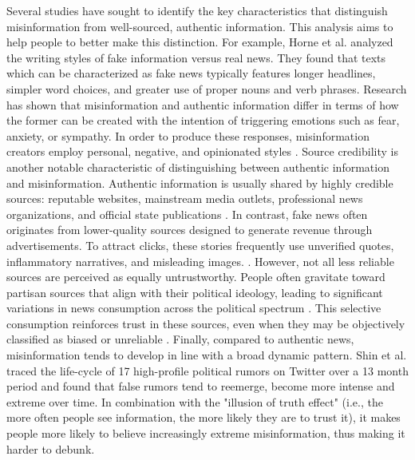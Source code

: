 Several studies have sought to identify the key characteristics that distinguish misinformation from well-sourced, authentic information. This analysis aims to help%
people to better make this distinction. For example, Horne et al. analyzed the writing styles of fake information versus real news. They found that texts which can be characterized as fake news typically features longer headlines, simpler word choices, and greater use of proper nouns and verb phrases\cite{horne2017just}.
Research has shown that misinformation and authentic information differ in terms of how the former can be created with the intention of triggering emotions such as fear, anxiety, or sympathy\cite{choudhary2021linguistic, zhang2020overview}. In order to produce these responses, misinformation creators %
employ personal, negative, and opinionated styles \cite{bessi2015trend,porat2019content}.
Source credibility is another notable characteristic of distinguishing between authentic information and misinformation. Authentic information is usually shared by highly credible sources: reputable websites, mainstream media outlets, professional news organizations, and official state publications \cite{molina2021fake,zhang2020overview,shin2018diffusion}.  In contrast, fake news often originates from lower-quality sources designed to generate revenue through advertisements.  To attract clicks, these stories frequently use unverified quotes, inflammatory narratives, and misleading images. %
\cite{molina2021fake,shu2017fake}. However, not all less reliable sources are perceived as equally untrustworthy. People often gravitate toward partisan sources that align with their political ideology, leading to significant variations in news consumption across the political spectrum \cite{faris2017partisanship}. This selective consumption reinforces trust in these sources, even when they may be objectively classified as biased or unreliable \cite{mummolo2016news, pennycook2019fighting}.
Finally, compared to authentic news, misinformation tends to develop in line with a broad dynamic pattern. Shin et al. traced the life-cycle of 17 high-profile political rumors on Twitter over a 13 month period and found that false rumors tend to reemerge, become more intense and extreme over time\cite{shin2018diffusion}. In combination with the "illusion of truth effect" (i.e., the more often people see information, the more likely they are to trust it), it makes people more likely to believe increasingly extreme misinformation, thus making it harder to debunk\cite{silva2017informative,yousif2019illusion}.

